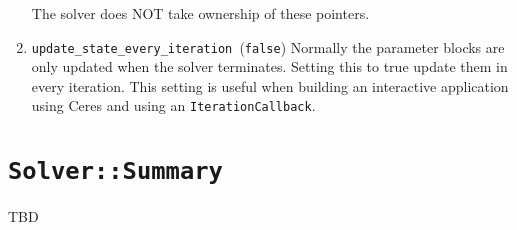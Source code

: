 \begin{enumerate}
     The solver does NOT take ownership of these pointers.

\item{\texttt{update\_state\_every\_iteration }}(\texttt{false})
Normally the parameter blocks are only updated when the solver terminates. Setting this to true update them in every iteration. This setting is useful when building an interactive application using Ceres and using an \texttt{IterationCallback}.
\end{enumerate}

\section{\texttt{Solver::Summary}}
TBD
